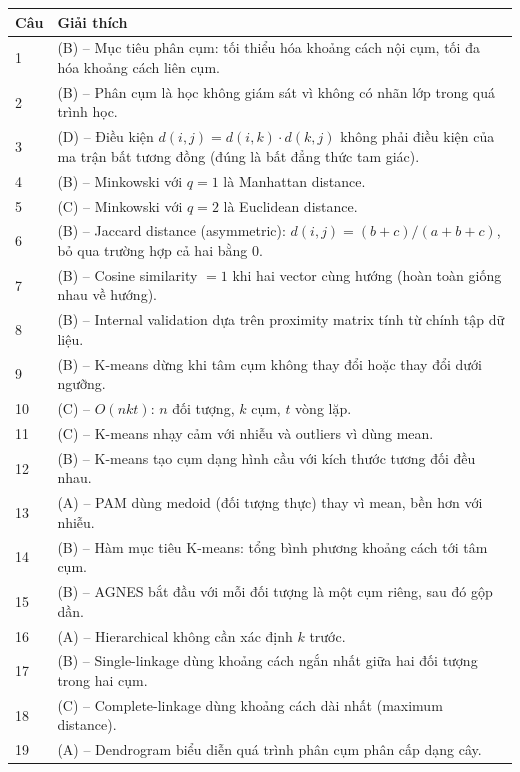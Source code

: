 \documentclass[10pt]{article}
\begin{document}
\begin{singlespace}
\begin{longtable}{|p{}|p{}|}
\hline
\textbf{Câu} & \textbf{Giải thích} \\
\hline
\endhead
1 & (B) -- Mục tiêu phân cụm: tối thiểu hóa khoảng cách nội cụm, tối đa hóa khoảng cách liên cụm. \\
\hline
2 & (B) -- Phân cụm là học không giám sát vì không có nhãn lớp trong quá trình học. \\
\hline
3 & (D) -- Điều kiện $d(i,j) = d(i,k) \cdot d(k,j)$ không phải điều kiện của ma trận bất tương đồng (đúng là bất đẳng thức tam giác). \\
\hline
4 & (B) -- Minkowski với $q=1$ là Manhattan distance. \\
\hline
5 & (C) -- Minkowski với $q=2$ là Euclidean distance. \\
\hline
6 & (B) -- Jaccard distance (asymmetric): $d(i,j) = (b+c)/(a+b+c)$, bỏ qua trường hợp cả hai bằng 0. \\
\hline
7 & (B) -- Cosine similarity $= 1$ khi hai vector cùng hướng (hoàn toàn giống nhau về hướng). \\
\hline
8 & (B) -- Internal validation dựa trên proximity matrix tính từ chính tập dữ liệu. \\
\hline
9 & (B) -- K-means dừng khi tâm cụm không thay đổi hoặc thay đổi dưới ngưỡng. \\
\hline
10 & (C) -- $O(nkt)$: $n$ đối tượng, $k$ cụm, $t$ vòng lặp. \\
\hline
11 & (C) -- K-means nhạy cảm với nhiễu và outliers vì dùng mean. \\
\hline
12 & (B) -- K-means tạo cụm dạng hình cầu với kích thước tương đối đều nhau. \\
\hline
13 & (A) -- PAM dùng medoid (đối tượng thực) thay vì mean, bền hơn với nhiễu. \\
\hline
14 & (B) -- Hàm mục tiêu K-means: tổng bình phương khoảng cách tới tâm cụm. \\
\hline
15 & (B) -- AGNES bắt đầu với mỗi đối tượng là một cụm riêng, sau đó gộp dần. \\
\hline
16 & (A) -- Hierarchical không cần xác định $k$ trước. \\
\hline
17 & (B) -- Single-linkage dùng khoảng cách ngắn nhất giữa hai đối tượng trong hai cụm. \\
\hline
18 & (C) -- Complete-linkage dùng khoảng cách dài nhất (maximum distance). \\
\hline
19 & (A) -- Dendrogram biểu diễn quá trình phân cụm phân cấp dạng cây. \\

\end{longtable}
\end{singlespace}
\end{document}
